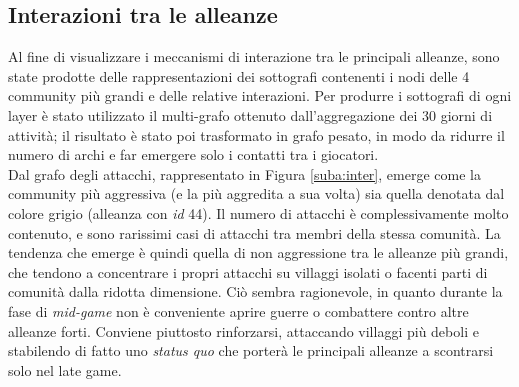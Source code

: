 \subsection{Interazioni tra le alleanze}
Al fine di visualizzare i meccanismi di interazione tra le principali alleanze, sono state prodotte delle rappresentazioni dei sottografi contenenti i nodi delle 4 community più grandi e delle relative interazioni. Per produrre i sottografi di ogni layer è stato utilizzato il multi-grafo ottenuto dall'aggregazione dei 30 giorni di attività; il risultato è stato poi trasformato in grafo pesato, in modo da ridurre il numero di archi e far emergere solo i contatti tra i giocatori.\\
Dal grafo degli attacchi, rappresentato in Figura \ref{suba:inter}, emerge come la community più aggressiva (e la più aggredita a sua volta) sia quella denotata dal colore grigio (alleanza con \textit{id} 44). Il numero di attacchi è complessivamente molto contenuto, e sono rarissimi casi di attacchi tra membri della stessa comunità. La tendenza che emerge è quindi quella di non aggressione tra le alleanze più grandi, che tendono a concentrare i propri attacchi su villaggi isolati o facenti parti di comunità dalla ridotta dimensione. Ciò sembra ragionevole, in quanto durante la fase di \textit{mid-game} non è conveniente aprire guerre o combattere contro altre alleanze forti. Conviene piuttosto rinforzarsi, attaccando villaggi più deboli e stabilendo di fatto uno \textit{status quo} che porterà le principali alleanze a scontrarsi solo nel late game.

